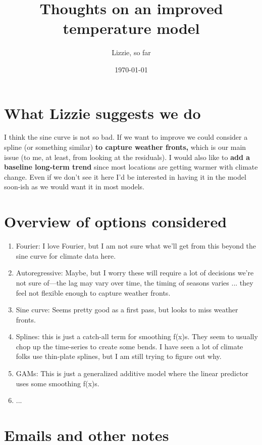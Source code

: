 \documentclass[11pt,letter]{article}
\begin{document}
\title{Thoughts on an improved temperature model}
\author{Lizzie, so far}
\date{\today}
\maketitle
\tableofcontents

\section{What Lizzie suggests we do}

I think the sine curve is not so bad. If we want to improve we could consider a spline (or something similar) {\bf to capture weather fronts,} which is our main issue (to me, at least, from looking at the residuals). I would also like to {\bf add a baseline long-term trend} since most locations are getting warmer with climate change. Even if we don't see it here I'd be interested in having it in the model soon-ish as we would want it in most models. 

\section{Overview of options considered}

\begin{enumerate}
\item Fourier: I love Fourier, but I am not sure what we'll get from this beyond the sine curve for climate data here.  
\item Autoregressive: Maybe, but I worry these will require a lot of decisions we're not sure of---the lag may vary over time, the timing of seasons varies ... they feel not flexible enough to capture weather fronts. 
\item Sine curve: Seems pretty good as a first pass, but looks to miss weather fronts. 
\item Splines: this is just a catch-all term for smoothing f(x)s. They seem to usually chop up the time-series to create some bends. I have seen a lot of climate folks use thin-plate splines, but I am still trying to figure out why. 
\item GAMs: This is just a generalized additive model where the linear predictor uses some smoothing f(x)s. 
\item ... 
\end{enumerate}

\section{Emails and other notes}
\end{document}
